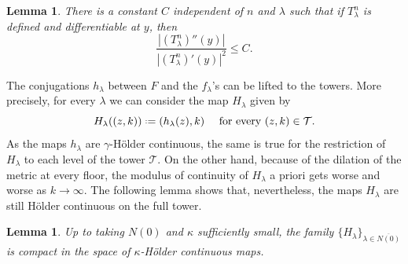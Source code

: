 \documentclass[11pt]{amsart}
\theoremstyle{plain}
\newtheorem{lem}[thm]{Lemma}
\theoremstyle{definition}
\theoremstyle{remark}
\newcommand*{\defeq}{\mathrel{\vcenter{\baselineskip0.5ex \lineskiplimit0pt
			\hbox{\scriptsize.}\hbox{\scriptsize.}}}%
	=}
\begin{document}
\begin{lem}\label{l:L2MS}
There is a constant $C$ independent of $n$ and $\lambda$ such that if $T_\lambda^n$
is defined and differentiable at $y$, then
\[
\frac{|(T^n_\lambda)'' (y)|}{|(T^n_\lambda)' (y)|^2} \leq C.
\]
\end{lem}

The conjugations $h_\lambda$ between 
$F$ and the $f_\lambda$'s can be lifted to the towers. More precisely, 
for every $\lambda$ we can
consider the map $H_\lambda$ given by
\[
H_\lambda ( (z,k))
\defeq (h_\lambda (z),k)
\quad \mbox{ for every }
(z,k)\in \mathcal T.
\]
As the maps $h_\lambda$ are $\gamma$-H\"older continuous, the same is true for the restriction of $H_\lambda$ to each level of the tower $\mathcal T$.
On the other hand, because of the dilation of the metric at every floor,
the modulus of continuity
of
$H_\lambda$
a priori gets worse and worse
as $k\to \infty$.
The following
lemma
shows that, nevertheless, the maps $H_\lambda$ 
are still
H\"older continuous 
on the full tower. 

\begin{lem}\label{l:Hlambda-logq}
Up to taking $N(0)$ and $\kappa$ sufficiently small, 
the family $\{H_\lambda\}_{\lambda \in\overline{ N(0)}}$
is compact
in the space 
of $\kappa$-H\"older continuous maps.
\end{lem}
\end{document}
